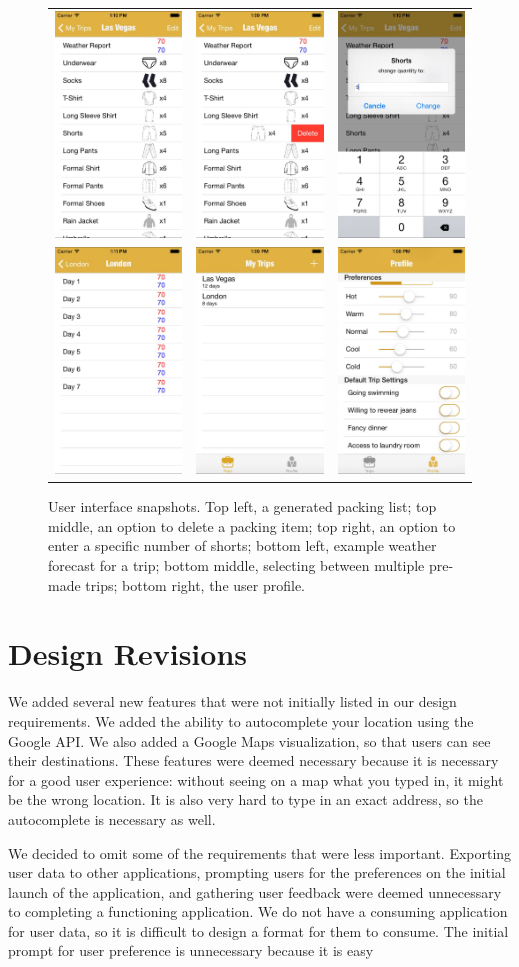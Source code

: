 \documentclass[11pt]{article}
\begin{document}
\begin{figure}
    \centering
    \begin{tabular}{ccc}
    \includegraphics[scale=0.2]{img/ui-2.jpg} & \includegraphics[scale=0.2]{img/ui-1.jpg} & \includegraphics[scale=0.2]{img/ui-7.jpg}\\
    \includegraphics[scale=0.2]{img/ui-5.jpg} & \includegraphics[scale=0.2]{img/ui-6.jpg} & \includegraphics[scale=0.2]{img/ui-4.jpg}
    \end{tabular}
    \caption{User interface snapshots. Top left, a generated packing list; top middle, an option to delete a packing item; top right, an option to enter a specific number of shorts; bottom left, example weather forecast for a trip; bottom middle, selecting between multiple pre-made trips; bottom right, the user profile.}
    \label{fig:ui}
\end{figure}

\section{Design Revisions}
We added several new features that were not initially listed in our design requirements. We added the ability to autocomplete your location using the Google API. We also added a Google Maps visualization, so that users can see their destinations. These features were deemed necessary because it is necessary for a good user experience: without seeing on a map what you typed in, it might be the wrong location. It is also very hard to type in an exact address, so the autocomplete is necessary as well.

We decided to omit some of the requirements that were less important. Exporting user data to other applications, prompting users for the preferences on the initial launch of the application, and gathering user feedback were deemed unnecessary to completing a functioning application. We do not have a consuming application for user data, so it is difficult to design a format for them to consume. The initial prompt for user preference is unnecessary because it is easy 
\end{document}
